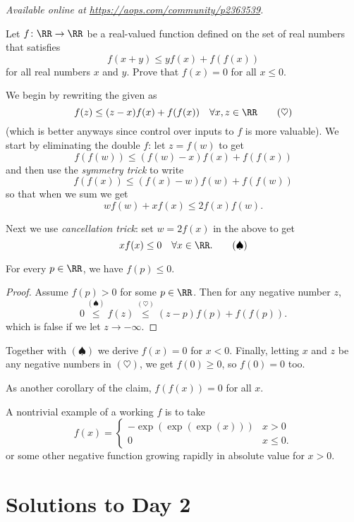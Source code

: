 \textsl{Available online at \url{https://aops.com/community/p2363539}.}
\begin{mdframed}[style=mdpurplebox,frametitle={Problem statement}]
Let $f \colon \RR \to \RR$ be a real-valued function
defined on the set of real numbers that satisfies
\[ f(x+y) \leq yf(x) + f(f(x))\]
for all real numbers $x$ and $y$.
Prove that $f(x) = 0$ for all $x \leq 0$.
\end{mdframed}
We begin by rewriting the given as
\[ f(z) \le (z-x)f(x) + f(f(x)) \quad
  \forall x,z \in \RR \qquad (\heartsuit) \]
(which is better anyways since control over inputs to $f$
is more valuable).
We start by eliminating the double $f$:
let $z = f(w)$ to get
\[ f(f(w)) \le (f(w)-x)f(x) + f(f(x)) \]
and then use the \emph{symmetry trick} to write
\[ f(f(x)) \le (f(x)-w)f(w) + f(f(w)) \]
so that when we sum we get
\[ wf(w) + xf(x) \le 2f(x)f(w). \]


Next we use \emph{cancellation trick}:
set $w = 2f(x)$ in the above to get
\[ xf(x) \le 0 \quad \forall x \in \RR. \qquad (\spadesuit) \]

\begin{claim*}
  For every $p \in \RR$, we have $f(p) \le 0$.
\end{claim*}
\begin{proof}
  Assume $f(p) > 0$ for some $p \in \RR$.
  Then for any negative number $z$,
  \[ 0 \overset{(\spadesuit)}{\le} f(z)
    \overset{(\heartsuit)}{\le} (z-p)f(p) + f(f(p)). \]
  which is false if we let $z \to -\infty$.
\end{proof}

Together with $(\spadesuit)$ we derive $f(x) = 0$ for $x < 0$.
Finally, letting $x$ and $z$ be any negative numbers
in $(\heartsuit)$, we get $f(0) \ge 0$, so $f(0) = 0$ too.
\begin{remark*}
  As another corollary of the claim, $f(f(x)) = 0$ for all $x$.
\end{remark*}
\begin{remark*}
  A nontrivial example of a working $f$
  is to take
  \[ f(x) = \begin{cases}
      -\exp(\exp(\exp(x))) & x > 0 \\
      0 & x \le 0.
    \end{cases} \]
  or some other negative function growing rapidly in absolute value
  for $x > 0$.
\end{remark*}
\pagebreak

\section{Solutions to Day 2}